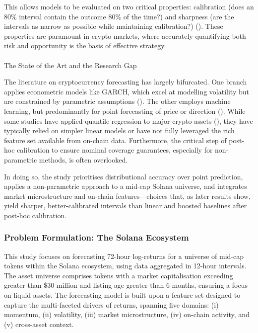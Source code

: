 \documentclass[
  a4paper,
  DIV=11,
  numbers=noendperiod]{scrreprt}
\makeatletter
\let\oldparagraph\paragraph
\renewcommand{\paragraph}{
    \@ifstar
      \xxxParagraphStar
      \xxxParagraphNoStar
  }
\newcommand{\xxxParagraphStar}[1]{\oldparagraph*{#1}\mbox{}}
\newcommand{\xxxParagraphNoStar}[1]{\oldparagraph{#1}\mbox{}}
\makeatother
\begin{document}
This allows models to be evaluated on two critical properties:
calibration (does an 80\% interval contain the outcome 80\% of the
time?) and sharpness (are the intervals as narrow as possible while
maintaining calibration?) (). These properties are paramount in crypto markets, where
accurately quantifying both risk and opportunity is the basis of
effective strategy.

\paragraph{The State of the Art and the Research
Gap}\label{the-state-of-the-art-and-the-research-gap}

The literature on cryptocurrency forecasting has largely bifurcated. One
branch applies econometric models like GARCH, which excel at modelling
volatility but are constrained by parametric assumptions
(). The other employs
machine learning, but predominantly for point forecasting of price or
direction ().
While some studies have applied quantile regression to major
crypto-assets (),
they have typically relied on simpler linear models or have not fully
leveraged the rich feature set available from on-chain data.
Furthermore, the critical step of post-hoc calibration to ensure nominal
coverage guarantees, especially for non-parametric methods, is often
overlooked.

In doing so, the study prioritises distributional accuracy over point
prediction, applies a non-parametric approach to a mid-cap Solana
universe, and integrates market microstructure and on-chain
features---choices that, as later results show, yield sharper,
better-calibrated intervals than linear and boosted baselines after
post-hoc calibration.

\subsubsection{Problem Formulation: The Solana
Ecosystem}\label{problem-formulation-the-solana-ecosystem}

This study focuses on forecasting 72-hour log-returns for a universe of
mid-cap tokens within the Solana ecosystem, using data aggregated in
12-hour intervals. The asset universe comprises tokens with a market
capitalisation exceeding greater than \$30 million and listing age
greater than 6 months, ensuring a focus on liquid assets. The
forecasting model is built upon a feature set designed to capture the
multi-faceted drivers of returns, spanning five domains: (i) momentum,
(ii) volatility, (iii) market microstructure, (iv) on-chain activity,
and (v) cross-asset context.
\end{document}
